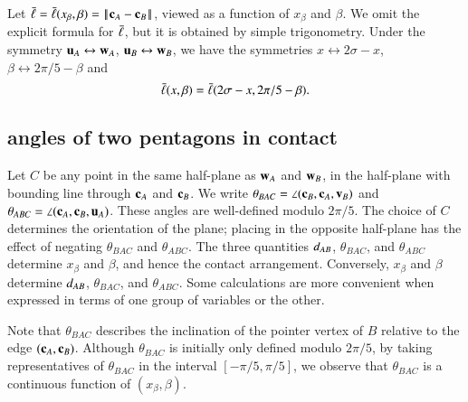 

Let $\bl = \bl(x_\beta,\beta) = \norm{\c_A}{\c_B}$, viewed as a function of
$x_\beta$ and $\beta$.  We omit the explicit formula for $\bar\ell$, but it is
obtained by simple trigonometry.  Under the symmetry
${\mathbf u}_A\leftrightarrow {\mathbf w}_A$, ${\mathbf u}_B\leftrightarrow{\mathbf w}_B$, we have the
symmetries $x\leftrightarrow 2\sigma-x$, $\beta\leftrightarrow
2\pi/5-\beta$ and
\[
\bar\ell(x,\beta) = \bar\ell(2\sigma-x,2\pi/5 - \beta).
\]

\subsection{angles of two pentagons in contact}\label{sec:xalpha}

Let $C$ be any point in the same half-plane as ${\mathbf w}_A$ and ${\mathbf w}_B$, in the
half-plane with bounding line through ${\mathbf c}_A$ and ${\mathbf c}_B$.  We write
$\theta_{BAC} = \angle ({\mathbf c}_B,{\mathbf c}_A,{\mathbf v}_B)$ and $\theta_{ABC} = \angle({\mathbf c}_A,{\mathbf c}_B,{\mathbf u}_A)$.
These angles are well-defined modulo $2\pi/5$.
The choice of $C$ determines the orientation of the plane; placing in the opposite
half-plane has the effect of negating $\theta_{BAC}$ and $\theta_{ABC}$.   The
three quantities $d_{AB}$, $\theta_{BAC}$, and $\theta_{ABC}$ determine $x_\beta$ and
$\beta$, and hence the contact arrangement.  
Conversely, $x_\beta$ and $\beta$ determine $d_{AB}$, $\theta_{BAC}$, and $\theta_{ABC}$.
Some calculations are more convenient when expressed in terms of one group of variables
or the other.

Note that $\theta_{BAC}$ describes the inclination of the pointer vertex of $B$ relative to the edge $({\mathbf c}_A,{\mathbf c}_B)$.
Although $\theta_{BAC}$ is initially only defined modulo $2\pi/5$, by taking representatives of $\theta_{BAC}$ in
the interval $[-\pi/5,\pi/5]$, we observe that $\theta_{BAC}$ is a continuous function of $(x_\beta,\beta)$.

